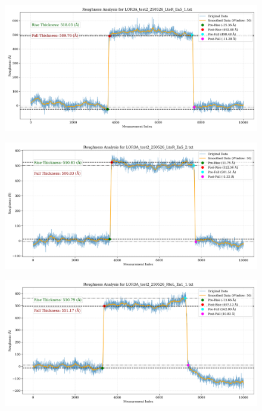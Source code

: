 \documentclass[platex,dvipdfmx,10pt,twoside,a4paper,jis2004]{jsarticle}
\begin{document}
\begin{figure}[H]
    \centering
    \includegraphics[width=\textwidth]{LOR3A_test2_250526_LtoR_Ea5_1.png}
    \label{fig:LOR3Atest2250526LtoREa51}
\end{figure}
\begin{figure}[H]
    \centering
    \includegraphics[width=\textwidth]{LOR3A_test2_250526_LtoR_Ea5_2.png}
    \label{fig:LOR3Atest2250526LtoREa52}
\end{figure}
\begin{figure}[H]
    \centering
    \includegraphics[width=\textwidth]{LOR3A_test2_250526_RtoL_Ea1_1.png}
    \label{fig:LOR3Atest2250526RtoLEa11}
\end{figure}
\end{document}
